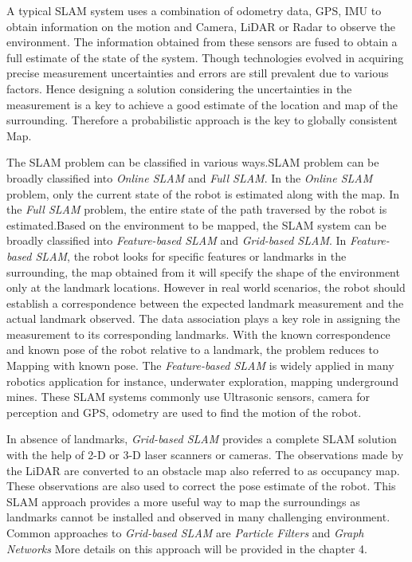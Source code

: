 A typical SLAM system uses a combination of odometry data, GPS, IMU to obtain information on the motion and Camera, LiDAR or Radar to observe the environment. The information obtained from these sensors are fused to obtain a full estimate of the state of the system. Though technologies evolved in acquiring precise measurement uncertainties and errors are still prevalent due to various factors. Hence designing a solution considering the uncertainties in the measurement is a key to achieve a good estimate of the location and map of the surrounding. Therefore a probabilistic approach is the key to globally consistent Map.

The SLAM problem can be classified in various ways.SLAM problem can be broadly classified into \textit{Online SLAM} and \textit{Full SLAM}. In the \textit{Online SLAM} problem, only the current state of the robot is estimated along with the map. In the \textit{Full SLAM} problem, the entire state of the path traversed by the robot is estimated.Based on the environment to be mapped, the SLAM system can be broadly classified into \textit{Feature-based SLAM} and \textit{Grid-based SLAM}. In \textit{Feature-based SLAM}, the robot looks for specific features or landmarks in the surrounding, the map obtained from it will specify the shape of the environment only at the landmark locations. However in real world scenarios, the robot should establish a correspondence between the expected landmark measurement and the actual landmark observed. The data association plays a key role in assigning the measurement to  its corresponding landmarks. With the known correspondence and known pose of the robot relative to a landmark, the problem reduces to Mapping with known pose. The \textit{Feature-based SLAM} is widely applied in many robotics application for instance, underwater exploration\cite{6678293}, mapping underground mines. These SLAM systems commonly use Ultrasonic sensors, camera for perception and GPS, odometry are used to find the motion of the robot.

In absence of landmarks, \textit{Grid-based SLAM} provides a complete SLAM solution with the help of 2-D or 3-D laser scanners or cameras. The observations made by the LiDAR are converted to an obstacle map also referred to as occupancy map. These observations are also used to correct the pose estimate of the robot. This SLAM approach provides a more useful way to map the surroundings as landmarks cannot be installed and observed in many challenging environment. Common approaches to \textit{Grid-based SLAM} are \textit{Particle Filters} and \textit{Graph Networks} More details on this approach will be provided in the chapter 4.


